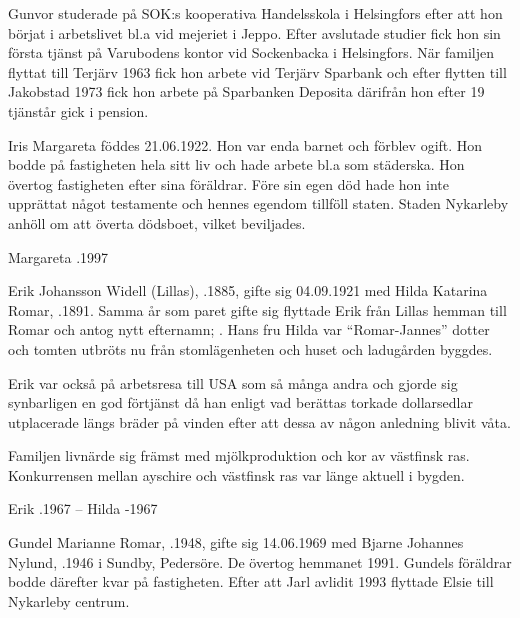 Gunvor studerade på SOK:s kooperativa Handelsskola i Helsingfors efter att hon börjat i arbetslivet bl.a vid mejeriet i Jeppo. Efter avslutade studier fick hon sin första tjänst på Varubodens kontor vid Sockenbacka i Helsingfors. När familjen flyttat till Terjärv 1963 fick hon arbete vid Terjärv Sparbank och efter flytten till Jakobstad 1973 fick hon arbete på Sparbanken Deposita därifrån hon efter 19 tjänstår gick i pension.


Iris Margareta föddes 21.06.1922. Hon var enda barnet och förblev ogift. Hon bodde på fastigheten hela sitt liv och hade arbete bl.a som städerska. Hon övertog fastigheten efter sina föräldrar. Före sin egen död hade hon inte upprättat något testamente och hennes egendom tillföll staten. Staden Nykarleby anhöll om att överta dödsboet, vilket beviljades.

Margareta .1997


Erik Johansson Widell (Lillas), .1885, gifte sig 04.09.1921 med Hilda Katarina Romar, .1891. Samma år som paret gifte sig flyttade Erik från Lillas hemman till Romar och antog nytt efternamn; . Hans fru Hilda var ``Romar-Jannes'' dotter och tomten utbröts nu från stomlägenheten och huset och ladugården byggdes.

Erik var också på arbetsresa till USA som så många andra och gjorde sig synbarligen en god förtjänst då han enligt vad berättas torkade
dollarsedlar utplacerade längs bräder på vinden efter att dessa av någon anledning blivit våta.

Familjen livnärde sig främst med mjölkproduktion och kor av västfinsk ras. Konkurrensen mellan ayschire och västfinsk ras var länge aktuell i bygden.

Erik .1967  --  Hilda -1967






Gundel Marianne Romar, .1948, gifte sig 14.06.1969 med Bjarne Johannes Nylund, .1946 i Sundby, Pedersöre. De övertog hemmanet 1991. Gundels föräldrar bodde därefter kvar på fastigheten. Efter att Jarl avlidit 1993 flyttade Elsie till Nykarleby centrum.


